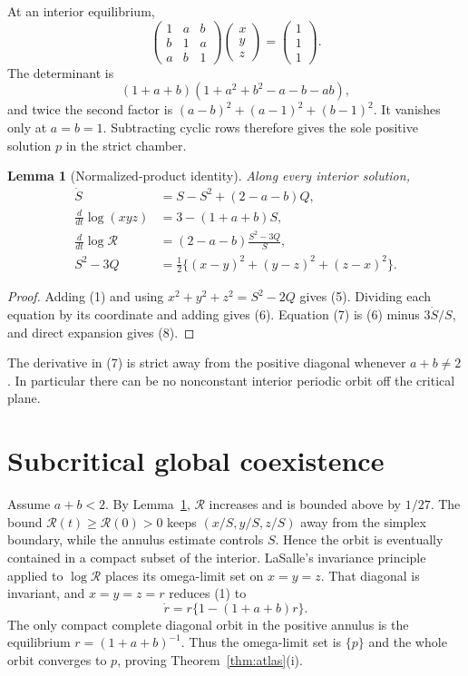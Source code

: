 \documentclass[10pt]{article}
\newtheorem{lemma}{Lemma}
\theoremstyle{remark}
\newcommand{\R}{\mathcal R}
\begin{document}
At an interior equilibrium,
\[
 \begin{pmatrix}1&a&b\\ b&1&a\\ a&b&1\end{pmatrix}
 \begin{pmatrix}x\\y\\z\end{pmatrix}
 =\begin{pmatrix}1\\1\\1\end{pmatrix}.
\]
The determinant is
\[
 (1+a+b)(1+a^2+b^2-a-b-ab),
\]
and twice the second factor is
$(a-b)^2+(a-1)^2+(b-1)^2$.  It vanishes only at $a=b=1$.
Subtracting cyclic rows therefore gives the sole positive solution $p$ in
the strict chamber.

\begin{lemma}[Normalized-product identity]\label{lem:key}
Along every interior solution,
\begin{align}
 \dot S&=S-S^2+(2-a-b)Q,\\
 \frac{d}{dt}\log(xyz)&=3-(1+a+b)S,\\
 \frac{d}{dt}\log\R&=(2-a-b)\frac{S^2-3Q}{S},\\
 S^2-3Q&=\tfrac12\{(x-y)^2+(y-z)^2+(z-x)^2\}.
\end{align}
\end{lemma}

\begin{proof}
Adding (1) and using $x^2+y^2+z^2=S^2-2Q$ gives (5).  Dividing each equation
by its coordinate and adding gives (6).  Equation (7) is (6) minus
$3\dot S/S$, and direct expansion gives (8).
\end{proof}

The derivative in (7) is strict away from the positive diagonal whenever
$a+b\ne2$.  In particular there can be no nonconstant interior periodic
orbit off the critical plane.

\section{Subcritical global coexistence}

Assume $a+b<2$.  By Lemma~\ref{lem:key}, $\R$ increases and is bounded above
by $1/27$.  The bound $\R(t)\geq\R(0)>0$ keeps $(x/S,y/S,z/S)$ away from the
simplex boundary, while the annulus estimate controls $S$.  Hence the orbit
is eventually contained in a compact subset of the interior.  LaSalle's
invariance principle applied to $\log\R$ places its omega-limit set on
$x=y=z$.  That diagonal is invariant, and $x=y=z=r$ reduces (1) to
\begin{equation}
             \dot r=r\{1-(1+a+b)r\}.
\end{equation}
The only compact complete diagonal orbit in the positive annulus is the
equilibrium $r=(1+a+b)^{-1}$.  Thus the omega-limit set is $\{p\}$ and the
whole orbit converges to $p$, proving Theorem~\ref{thm:atlas}(i).
\end{document}
